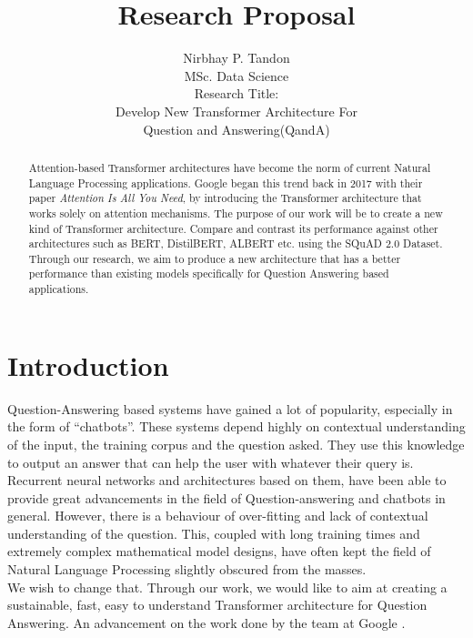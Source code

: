 \documentclass[11pt]{article}
\begin{document}
	\title{Research Proposal}

	\author{Nirbhay P. Tandon\\MSc. Data Science\\
		Research Title:\\Develop New Transformer Architecture For \\ Question and Answering(QandA)
	}
	\date{}
	\maketitle

	\newpage
	\begin{abstract}
		Attention-based Transformer architectures have become the norm of current Natural Language Processing applications. Google began this trend back in 2017 with their paper \textit{Attention Is All You Need}, by introducing the Transformer architecture that works solely on attention mechanisms. The purpose of our work will be to create a new kind of Transformer architecture. Compare and contrast its performance against other architectures such as BERT, DistilBERT, ALBERT etc. using the SQuAD 2.0 Dataset. Through our research, we aim to produce a new architecture that has a better performance than existing models specifically for Question Answering based applications.
	\end{abstract}
	\newpage
	\tableofcontents
	\newpage
	\listoffigures
	\newpage
	\section{Introduction}\label{introduction}

	Question-Answering based systems have gained a lot of popularity, especially in the form of ``chatbots''. These systems depend highly on contextual understanding of the input, the training corpus and the question asked. They use this knowledge to output an answer that can help the user with whatever their query is. Recurrent neural networks and architectures based on them, have been able to provide great advancements in the field of Question-answering and chatbots in general. However, there is a behaviour of over-fitting and lack of contextual understanding of the question. This, coupled with long training times and extremely complex mathematical model designs, have often kept the field of Natural Language Processing slightly obscured from the masses.
	\\
	We wish to change that. Through our work, we would like to aim at creating a sustainable, fast, easy to understand Transformer architecture for Question Answering. An advancement on the work done by the team at Google \citep{atayl}.
\end{document}
